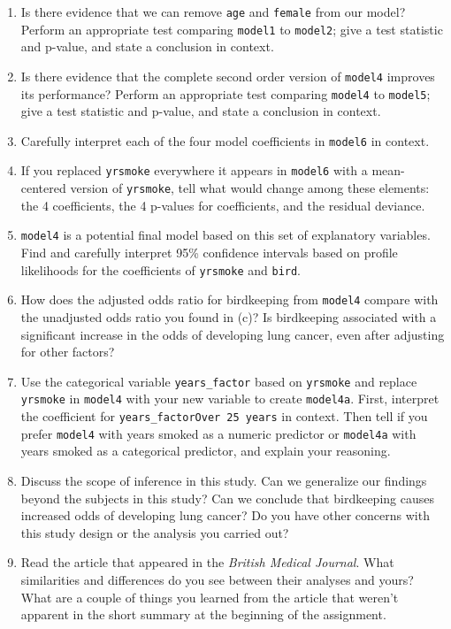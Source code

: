 \documentclass[
]{krantz}
\begin{document}
\begin{enumerate}
  \begin{enumerate}
  \def\labelenumii{\alph{enumii}.}
  \setcounter{enumii}{5}
  \item
    Is there evidence that we can remove \texttt{age} and \texttt{female} from our model? Perform an appropriate test comparing \texttt{model1} to \texttt{model2}; give a test statistic and p-value, and state a conclusion in context.
  \item
    Is there evidence that the complete second order version of \texttt{model4} improves its performance? Perform an appropriate test comparing \texttt{model4} to \texttt{model5}; give a test statistic and p-value, and state a conclusion in context.
  \item
    Carefully interpret each of the four model coefficients in \texttt{model6} in context.
  \item
    If you replaced \texttt{yrsmoke} everywhere it appears in \texttt{model6} with a mean-centered version of \texttt{yrsmoke}, tell what would change among these elements: the 4 coefficients, the 4 p-values for coefficients, and the residual deviance.
  \item
    \texttt{model4} is a potential final model based on this set of explanatory variables. Find and carefully interpret 95\% confidence intervals based on profile likelihoods for the coefficients of \texttt{yrsmoke} and \texttt{bird}.
  \item
    How does the adjusted odds ratio for birdkeeping from \texttt{model4} compare with the unadjusted odds ratio you found in (c)? Is birdkeeping associated with a significant increase in the odds of developing lung cancer, even after adjusting for other factors?
  \item
    Use the categorical variable \texttt{years\_factor} based on \texttt{yrsmoke} and replace \texttt{yrsmoke} in \texttt{model4} with your new variable to create \texttt{model4a}. First, interpret the coefficient for \texttt{years\_factorOver\ 25\ years} in context. Then tell if you prefer \texttt{model4} with years smoked as a numeric predictor or \texttt{model4a} with years smoked as a categorical predictor, and explain your reasoning.
  \item
    Discuss the scope of inference in this study. Can we generalize our findings beyond the subjects in this study? Can we conclude that birdkeeping causes increased odds of developing lung cancer? Do you have other concerns with this study design or the analysis you carried out?
  \item
    Read the article that appeared in the \emph{British Medical Journal}. What similarities and differences do you see between their analyses and yours? What are a couple of things you learned from the article that weren't apparent in the short summary at the beginning of the assignment.
  \end{enumerate}
\end{enumerate}
\end{document}
